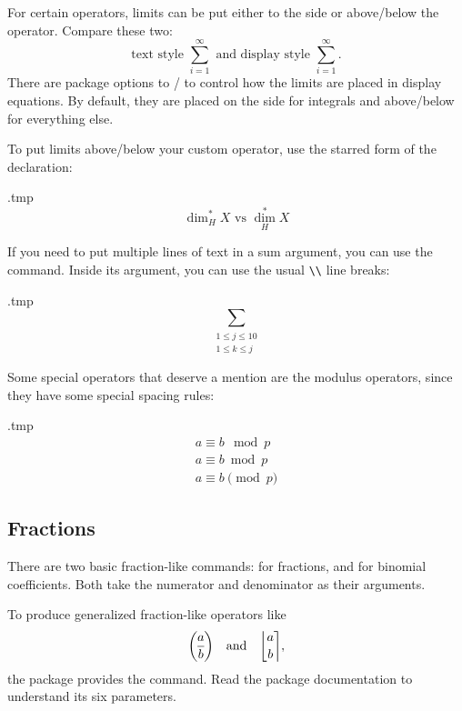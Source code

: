 For certain operators, limits can be put either to the side or above/below the operator.
Compare these two:
\[
\text{text style }\textstyle \sum_{i=1}^\infty
\text{ and display style }\displaystyle \sum_{i=1}^\infty.
\]
There are package options to /
to control how the limits are placed in display equations.
By default, they are placed on the side for integrals and above/below for everything else.

To put limits above/below your custom operator, use the starred form of the declaration:
%
\begin{VerbatimOut}{\jobname.tmp}
\[
\operatorname{dim}_H^\ast X
\text{ vs }
\operatorname*{dim}_H^\ast X
\]
\end{VerbatimOut}
\ShowExample

If you need to put multiple lines of text in a sum argument,
you can use the  command.
Inside its argument, you can use the usual \verb|\\| line breaks:
%
\begin{VerbatimOut}{\jobname.tmp}
\[
\sum_{\substack{1 \leq j \leq 10\\ 1 \leq k \leq j}}
\]
\end{VerbatimOut}
\ShowExample


Some special operators that deserve a mention are the modulus operators,
since they have some special spacing rules:
%
\begin{VerbatimOut}{\jobname.tmp}
\begin{gather*}
a \equiv b \mod p\\
a \equiv b \bmod p\\
a \equiv b \pmod p
\end{gather*}
\end{VerbatimOut}
\ShowExample


%
%
\subsection{Fractions}
There are two basic fraction-like commands:  for fractions,
and  for binomial coefficients.
Both take the numerator and denominator as their arguments.

To produce generalized fraction-like operators like
\[
\genfrac{(}{)}{}{}{a}{b}
\quad\text{and}\quad
\genfrac{\lfloor}{\rceil}{0pt}{}{a}{b},
\]
the  package provides the  command.
Read the package documentation to understand its six parameters.

